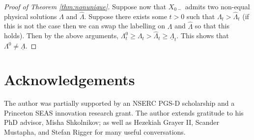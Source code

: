 \documentclass[12pt]{amsart}
\newcommand{\ubar}{\underline}
\theoremstyle{plain}
\theoremstyle{definition}
\begin{document}
\begin{proof}[Proof of Theorem \ref{thm:nonunique}]
\medskip

Suppose now that $X_{0-}$ admits two non-equal physical solutions $\Lambda$ and $\hat{\Lambda}$. Suppose there exists some $t>0$ such that $\Lambda_t>\hat{\Lambda}_t$ (if this is not the case then we can swap the labelling on $\Lambda$ and $\hat{\Lambda}$ so that this holds). Then by the above arguments, ${\Lambda^0_t\ge\Lambda_t>\hat{\Lambda}_t\ge \ubar{\Lambda}_t}$. This shows that $\Lambda^0\neq \ubar{\Lambda}$. \qedhere

\end{proof}

\section*{Acknowledgements}

The author was partially supported by an NSERC PGS-D scholarship and a Princeton SEAS innovation research grant. The author extends gratitude to his PhD advisor, Misha Shkolnikov; as well as Hezekiah Grayer II, Scander Mustapha, and Stefan Rigger for many useful conversations.

\printbibliography

\bigskip\bigskip
\end{document}
